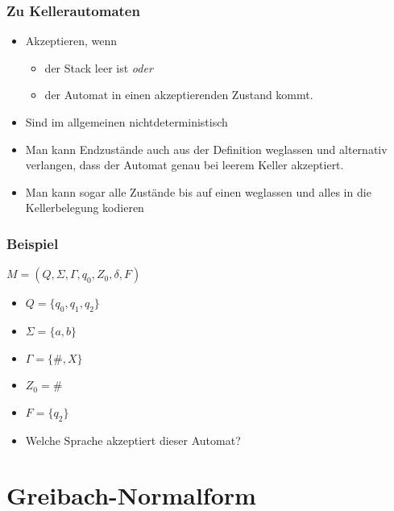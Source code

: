 \begin{frame}
\frametitle{Zu Kellerautomaten}
\begin{itemize}
\item Akzeptieren, wenn \begin{itemize}
	\item der Stack leer ist \emph{oder}
	\item der Automat in einen akzeptierenden Zustand kommt.
\end{itemize}
\item Sind im allgemeinen nichtdeterministisch
\item Man kann Endzustände auch aus der Definition weglassen und alternativ verlangen, dass der Automat genau bei leerem Keller akzeptiert.
\item Man kann sogar alle Zustände bis auf einen weglassen und alles in die Kellerbelegung kodieren
\end{itemize}
\end{frame}

\begin{frame}
\frametitle{Beispiel}
$M = (Q, \Sigma, \Gamma, q_0, Z_0, \delta, F)$
\begin{itemize}
\item $Q = \{q_0, q_1, q_2\}$
\item $\Sigma = \{a,b\}$
\item $\Gamma = \{\#,X\}$
\item $Z_0 = \#$
\item $F = \{q_2\}$
\end{itemize}
\begin{figure}
\end{figure}

\begin{itemize}
\item Welche Sprache akzeptiert dieser Automat?
\end{itemize}
\end{frame}

\section{Greibach-Normalform}
